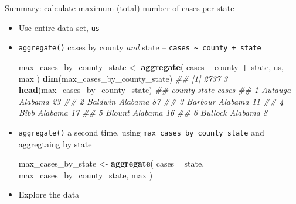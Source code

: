 \documentclass[]{book}
\newenvironment{Shaded}{\begin{snugshade}}{\end{snugshade}}
\newcommand{\CommentTok}[1]{\textcolor[rgb]{0.56,0.35,0.01}{\textit{#1}}}
\newcommand{\KeywordTok}[1]{\textcolor[rgb]{0.13,0.29,0.53}{\textbf{#1}}}
\newcommand{\NormalTok}[1]{#1}
\newcommand{\OperatorTok}[1]{\textcolor[rgb]{0.81,0.36,0.00}{\textbf{#1}}}
\newcommand{\StringTok}[1]{\textcolor[rgb]{0.31,0.60,0.02}{#1}}
\begin{document}
\begin{itemize}
\begin{Shaded}
\end{Shaded}
\end{itemize}

Summary: calculate maximum (total) number of cases per state

\begin{itemize}
\item
  Use entire data set, \texttt{us}
\item
  \texttt{aggregate()} cases by county \emph{and} state -- \texttt{cases\ \textasciitilde{}\ county\ +\ state}

\begin{Shaded}
\begin{Highlighting}[]
\NormalTok{max_cases_by_county_state <-}
\StringTok{    }\KeywordTok{aggregate}\NormalTok{( cases }\OperatorTok{~}\StringTok{ }\NormalTok{county }\OperatorTok{+}\StringTok{ }\NormalTok{state, us, max )}
\KeywordTok{dim}\NormalTok{(max_cases_by_county_state)}
\CommentTok{## [1] 2737    3}
\KeywordTok{head}\NormalTok{(max_cases_by_county_state)}
\CommentTok{##    county   state cases}
\CommentTok{## 1 Autauga Alabama    23}
\CommentTok{## 2 Baldwin Alabama    87}
\CommentTok{## 3 Barbour Alabama    11}
\CommentTok{## 4    Bibb Alabama    17}
\CommentTok{## 5  Blount Alabama    16}
\CommentTok{## 6 Bullock Alabama     8}
\end{Highlighting}
\end{Shaded}
\item
  \texttt{aggregate()} a second time, using \texttt{max\_cases\_by\_county\_state} and aggregtaing by state

\begin{Shaded}
\begin{Highlighting}[]
\NormalTok{max_cases_by_state <-}
\StringTok{    }\KeywordTok{aggregate}\NormalTok{( cases }\OperatorTok{~}\StringTok{ }\NormalTok{state, max_cases_by_county_state, max )}
\end{Highlighting}
\end{Shaded}
\item
  Explore the data


\end{itemize}
\end{document}
